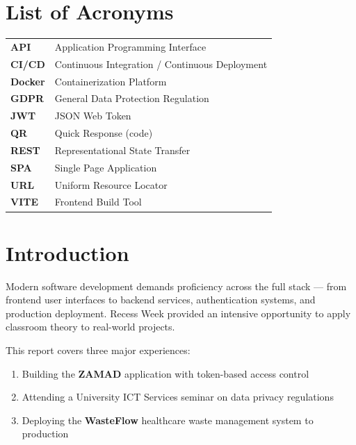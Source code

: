 \documentclass[12pt,a4paper]{article}
\begin{document}
\section*{List of Acronyms}
\begin{table}[h]
    \centering
    \begin{tabular}{ll}
        \textbf{API}  & Application Programming Interface \\
        \textbf{CI/CD} & Continuous Integration / Continuous Deployment \\
        \textbf{Docker} & Containerization Platform \\
        \textbf{GDPR} & General Data Protection Regulation \\
        \textbf{JWT}  & JSON Web Token \\
        \textbf{QR}   & Quick Response (code) \\
        \textbf{REST} & Representational State Transfer \\
        \textbf{SPA}  & Single Page Application \\
        \textbf{URL}  & Uniform Resource Locator \\
        \textbf{VITE} & Frontend Build Tool \\
    \end{tabular}
\end{table}

\newpage
\section{Introduction}
\label{sec:introduction}

Modern software development demands proficiency across the full stack --- from frontend user interfaces to backend services, authentication systems, and production deployment. Recess Week provided an intensive opportunity to apply classroom theory to real-world projects.

This report covers three major experiences:
\begin{enumerate}
    \item Building the \textbf{ZAMAD} application with token-based access control
    \item Attending a University ICT Services seminar on data privacy regulations
    \item Deploying the \textbf{WasteFlow} healthcare waste management system to production
\end{enumerate}
\end{document}
